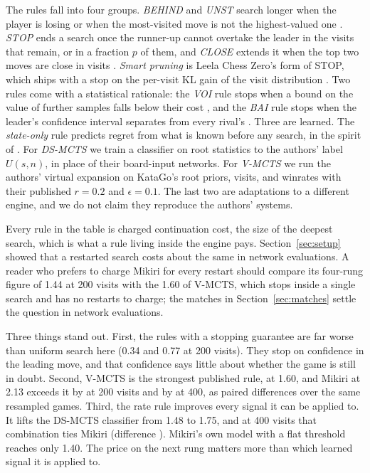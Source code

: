 The rules fall into four groups. \emph{BEHIND} and \emph{UNST} search longer when the player is losing or when the most-visited move is not the highest-valued one \citep{huang2010time}. \emph{STOP} ends a search once the runner-up cannot overtake the leader in the visits that remain, or in a fraction $p$ of them, and \emph{CLOSE} extends it when the top two moves are close in visits \citep{baier2016time}. \emph{Smart pruning} is Leela Chess Zero's form of STOP, which ships with a stop on the per-visit KL gain of the visit distribution \citep{lc0_options}. Two rules come with a statistical rationale: the \emph{VOI} rule stops when a bound on the value of further samples falls below their cost \citep{hay2012selecting}, and the \emph{BAI} rule stops when the leader's confidence interval separates from every rival's \citep{kaufmann2017monte}. Three are learned. The \emph{state-only} rule predicts regret from what is known before any search, in the spirit of \citet{muppidi2026finding}. For \emph{DS-MCTS} \citep{lan2021learning} we train a classifier on root statistics to the authors' label $U(s,n)$, in place of their board-input networks. For \emph{V-MCTS} \citep{ye2022spending} we run the authors' virtual expansion on KataGo's root priors, visits, and winrates with their published $r=0.2$ and $\epsilon=0.1$. The last two are adaptations to a different engine, and we do not claim they reproduce the authors' systems.

Every rule in the table is charged continuation cost, the size of the deepest search, which is what a rule living inside the engine pays. Section~\ref{sec:setup} showed that a restarted search costs about the same in network evaluations. A reader who prefers to charge Mikiri for every restart should compare its four-rung figure of 1.44 at 200 visits with the 1.60 of V-MCTS, which stops inside a single search and has no restarts to charge; the matches in Section~\ref{sec:matches} settle the question in network evaluations.

Three things stand out. First, the rules with a stopping guarantee are far worse than uniform search here (0.34 and 0.77 at 200 visits). They stop on confidence in the leading move, and that confidence says little about whether the game is still in doubt. Second, V-MCTS is the strongest published rule, at 1.60, and Mikiri at 2.13 exceeds it by \pairedVmctsTwo{} at 200 visits and by \pairedVmctsFour{} at 400, as paired differences over the same resampled games. Third, the rate rule improves every signal it can be applied to. It lifts the DS-MCTS classifier from 1.48 to 1.75, and at 400 visits that combination ties Mikiri (difference \pairedDsRateFour). Mikiri's own model with a flat threshold reaches only 1.40. The price on the next rung matters more than which learned signal it is applied to.

